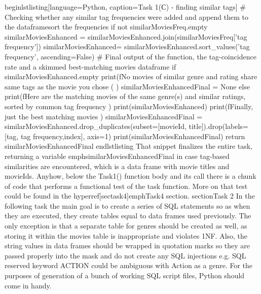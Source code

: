begin{lstlisting}[language=Python, caption=Task 1(С) - finding similar tags]
        # Checking whether any similar tag frequencies were added and append them to the dataframesort the frequencies
        if not similarMoviesFreq.empty
                similarMoviesEnhanced = similarMoviesEnhanced.join(similarMoviesFreq['tag frequency'])
                similarMoviesEnhanced= similarMoviesEnhanced.sort_values('tag frequency', ascending=False)
        # Final output of the function, the tag-coincidence rate and a skimmed best-matching movies dataframe
        if similarMoviesEnhanced.empty
                print(fNo movies of similar genre and rating share same tags as the movie you chose ( )
                similarMoviesEnhancedFinal  = None
        else
                print(fHere are the matching movies of the same genre(s) and similar ratings, sorted  by common tag frequency )
                print(similarMoviesEnhanced)
                print(fFinally, just the best matching movies )
                similarMoviesEnhancedFinal = similarMoviesEnhanced.drop_duplicates(subset=[movieId, title]).drop(labels=[tag, tag frequency,index], axis=1)
                print(similarMoviesEnhancedFinal)
        return similarMoviesEnhancedFinal
end{lstlisting}
That snippet finalizes the entire task, returning a variable emph{similarMoviesEnhancedFinal} in case tag-based similarities are encountered, which is a data frame with  movie titles and movieIds.
Anyhow, below the Task1() function body and its call there is a chunk of code that performs a
functional test of the task function. More on that test could be found in the hyperref[sectask4]{emph{Task4}}
section.
section{Task 2}
In the following task the main goal is to create a series of SQL statements so as when
they are executed, they create tables equal to data frames used previously. The only exception is that 
a separate table for genres should be created as well, as storing it within the movies table is inappropriate and violates 1NF. Also, the string values in data frames should be wrapped in quotation marks so they are passed properly into the mask and do not create any SQL injections e.g. SQL reserved keyword ACTION could be ambiguous with Action as a genre.
For the purposes of generation of a  bunch of working SQL script files, Python should come in handy.

